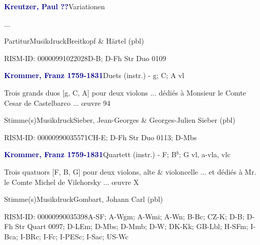 \documentclass[twocolumn]{book}
\begin{document}
\par \vspace{7pt} \textcolor{darkblue}{\textbf{Kreutzer, Paul  ??}}\hfillplus{\textbf{[294]}}\newline Variationen
\par \begin{itshape}...\end{itshape} 
\par \textcolor{darkblue}{}  Partitur\newline Musikdruck\newline Breitkopf \& Härtel  (pbl)
\par RISM-ID: 00000991022028\newline D-B; D-Fh  Str Duo 0109
\par \vspace{7pt} \textcolor{darkblue}{\textbf{Krommer, Franz  1759-1831}}\hfillplus{\textbf{[295]}}\newline Duets (instr.) - g; C; A vl
\par \begin{itshape}Trois grands duos [g, C, A] pour deux violons ... dédiés à Monsieur le Comte Cesar de Castelbarco ... œuvre 94\end{itshape} 
\par \textcolor{darkblue}{}  Stimme(s)\newline Musikdruck\newline Sieber, Jean-Georges \& Georges-Julien Sieber  (pbl)
\par RISM-ID: 00000990035571\newline CH-E; D-Fh  Str Duo 0113; D-Mbs
\par \vspace{7pt} \textcolor{darkblue}{\textbf{Krommer, Franz  1759-1831}}\hfillplus{\textbf{[296]}}\newline Quartett (instr.) - F; B$^b$; G vl, a-vla, vlc
\par \begin{itshape}Trois quatuors [F, B, G] pour deux violons, alte \& violoncelle ... et dédiés à Mr. le Comte Michel de Vilehorsky ... œuvre X\end{itshape} 
\par \textcolor{darkblue}{}  Stimme(s)\newline Musikdruck\newline Gombart, Johann Carl  (pbl)
\par RISM-ID: 00000990035398\newline A-SF; A-Wgm; A-Wmi; A-Wn; B-Bc; CZ-K; D-B; D-Fh  Str Quart 0097; D-LEm; D-Mbs; D-Mmb; D-W; DK-Kk; GB-Lbl; H-SFm; I-Bca; I-BRc; I-Fc; I-PESc; I-Sac; US-Wc
\end{document}
